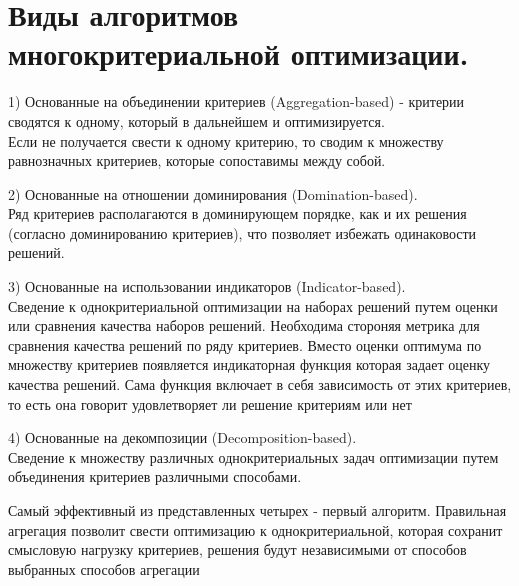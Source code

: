 \section{Виды алгоритмов многокритериальной оптимизации.}
1) Основанные на объединении критериев (Aggregation-based) - критерии сводятся к одному, который в дальнейшем и оптимизируется. \\
Если не получается свести к одному критерию, то сводим к множеству равнозначных критериев, которые сопоставимы между собой.

2) Основанные на отношении доминирования (Domination-based).\\
Ряд критериев располагаются в доминирующем порядке, как и их решения (согласно доминированию критериев), что позволяет избежать одинаковости решений.

3) Основанные на использовании индикаторов (Indicator-based). \\
Сведение к однокритериальной оптимизации на наборах решений путем оценки или сравнения качества наборов решений. Необходима стороняя метрика для сравнения качества решений по ряду критериев. Вместо оценки оптимума по множеству критериев появляется индикаторная функция которая задает оценку качества решений. Сама функция включает в себя зависимость от этих критериев, то есть она говорит удовлетворяет ли решение критериям или нет 

4) Основанные на декомпозиции (Decomposition-based).\\
Сведение к множеству различных однокритериальных задач оптимизации путем объединения критериев различными способами.

Самый эффективный из представленных четырех - первый алгоритм. Правильная агрегация позволит свести оптимизацию к однокритериальной, которая сохранит смысловую нагрузку критериев, решения будут независимыми от способов выбранных способов агрегации
